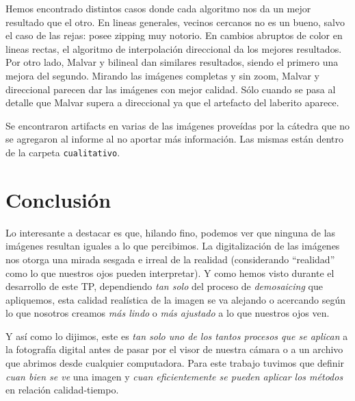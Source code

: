 \vspace{\baselineskip}

Hemos encontrado distintos casos donde cada algoritmo nos da un mejor resultado que el otro. En lineas generales, vecinos cercanos no es un bueno, salvo el caso de las rejas: posee zipping muy notorio. En cambios abruptos de color en lineas rectas, el algoritmo de interpolación direccional da los mejores resultados. Por otro lado, Malvar y bilineal dan similares resultados, siendo el primero una mejora del segundo. Mirando las imágenes completas y sin zoom, Malvar y direccional parecen dar las imágenes con mejor calidad. Sólo cuando se pasa al detalle que Malvar supera a direccional ya que el artefacto del laberito aparece.

Se encontraron artifacts en varias de las imágenes proveídas por la cátedra que no se agregaron al informe al no aportar más información. Las mismas están dentro de la carpeta \texttt{cualitativo}.


\newpage

\section{Conclusión}

Lo interesante a destacar es que, hilando fino, podemos ver que ninguna de las imágenes resultan iguales a lo que percibimos. La digitalización de las imágenes nos otorga una mirada sesgada e irreal de la realidad (considerando ``realidad'' como lo que nuestros ojos pueden interpretar). Y como hemos visto durante el desarrollo de este TP, dependiendo \textit{tan solo} del proceso de \textit{demosaicing} que apliquemos, esta calidad realística de la imagen se va alejando o acercando según lo que nosotros creamos \textit{más lindo} o \textit{más ajustado} a lo que nuestros ojos ven.

Y así como lo dijimos, este es \textit{tan solo uno de los tantos procesos que se aplican} a la fotografía digital antes de pasar por el visor de nuestra cámara o a un archivo que abrimos desde cualquier computadora. Para este trabajo tuvimos que definir \textit{cuan bien se ve} una imagen y \textit{cuan eficientemente se pueden aplicar los métodos} en relación calidad-tiempo. 

